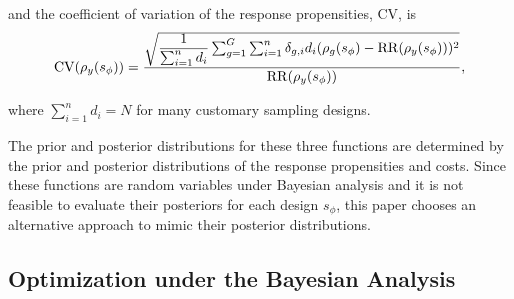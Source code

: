 \documentclass[12pt]{article}
\begin{document}
and the coefficient of variation of the response propensities, $\mathrm{CV}$, is
\let\saveeqnno\theequation
\let\savefrac\frac
\def\dispfrac{\displaystyle\savefrac}
\begin{eqnarray}
\let\frac\dispfrac
\gdef\theequation{15}
\let\theHequation\theequation
\label{equation-CV}
	\mathrm{CV}(\rho_y(s_\phi))=\dfrac{\sqrt{\dfrac{1}{\sum^n_{i=1}d_i}\sum^G_{g=1}\sum^n_{i=1}\delta_{g,i}d_i(\rho_g(s_\phi)-\mathrm{RR}(\rho_y(s_\phi)))^2}}{\mathrm{RR}(\rho_y(s_\phi))},
\end{eqnarray}
\global\let\theequation\saveeqnno
\addtocounter{equation}{-1}\ignorespaces

where $\sum^n_{i=1}d_i=N$ for many customary sampling designs.

The prior and posterior distributions for these three functions are determined by the prior and posterior distributions of the response propensities and costs.
Since these functions are random variables under Bayesian analysis and it is not feasible to evaluate their posteriors for each design $s_\phi$, this paper chooses an alternative approach to mimic their posterior distributions.





\subsection{Optimization under the Bayesian Analysis}
\label{subsec:optimization-under-bayesian-analysis}
\end{document}
